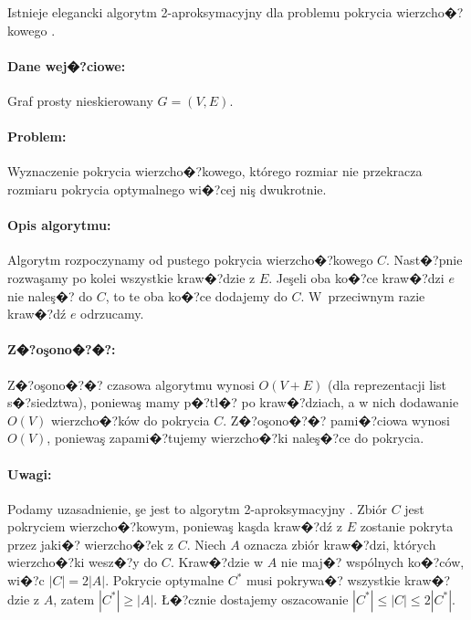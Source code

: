 \documentclass[12pt,a4paper]{mwrep}
\begin{document}
Istnieje elegancki algorytm 2-aproksymacyjny dla problemu
pokrycia wierzcho�?kowego \cite{CLRS}.

\paragraph{Dane wej�?ciowe:} Graf prosty nieskierowany $G=(V,E)$.

\paragraph{Problem:} Wyznaczenie pokrycia wierzcho�?kowego, którego
rozmiar nie przekracza rozmiaru pokrycia optymalnego
wi�?cej niş dwukrotnie.

\paragraph{Opis algorytmu:} Algorytm rozpoczynamy od pustego
pokrycia wierzcho�?kowego $C$. 
Nast�?pnie rozwaşamy po kolei wszystkie kraw�?dzie z $E$. 
Jeşeli oba ko�?ce kraw�?dzi $e$ nie naleş�? do $C$,
to te oba ko�?ce dodajemy do $C$.
W~przeciwnym razie kraw�?dź $e$ odrzucamy.

\paragraph{Z�?oşono�?�?:} Z�?oşono�?�? czasowa algorytmu wynosi $O(V+E)$
(dla reprezentacji list s�?siedztwa),
poniewaş mamy p�?tl�? po kraw�?dziach, a w nich dodawanie
$O(V)$ wierzcho�?ków do pokrycia $C$.
Z�?oşono�?�? pami�?ciowa wynosi $O(V)$, poniewaş zapami�?tujemy
wierzcho�?ki naleş�?ce do pokrycia.

\paragraph{Uwagi:} Podamy uzasadnienie, şe jest to algorytm
2-aproksymacyjny \cite{CLRS}. 
Zbiór $C$ jest pokryciem wierzcho�?kowym, poniewaş kaşda kraw�?dź z $E$
zostanie pokryta przez jaki�? wierzcho�?ek z $C$.
Niech $A$ oznacza zbiór kraw�?dzi, których wierzcho�?ki wesz�?y do $C$.
Kraw�?dzie w $A$ nie maj�? wspólnych ko�?ców, wi�?c $|C|=2|A|$.
Pokrycie optymalne $C^{*}$ musi pokrywa�? wszystkie kraw�?dzie z $A$,
zatem $|C^{*}| \ge |A|$.
Ł�?cznie dostajemy oszacowanie $|C^{*}| \le |C| \le 2|C^{*}|$.


\end{document}
